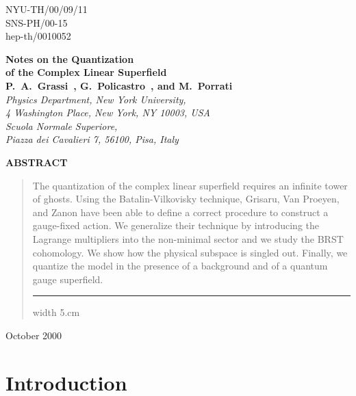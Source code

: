 \documentclass[a4paper,12pt]{article}
\begin{document}
\begin{titlepage}
\begin{flushright}
NYU-TH/00/09/11 \\
SNS-PH/00-15 \\
hep-th/0010052
\end{flushright}
\vfill
\begin{center}
{\LARGE\bf Notes on the Quantization \\ of the Complex Linear
  Superfield}    \\ 
  \large
{\bf  P.~A.~Grassi~\coordHE{}, G.~Policastro~\coordHE{},  and  M.~Porrati~\coordHE{}}\\
\vfill
{\small \it
{}\coordHE{} Physics Department, New York University, \\ 
4 Washington Place, New York,  NY 10003,  USA \\ \vspace{.2cm}
\coordHE{} Scuola Normale Superiore, \\ 
Piazza dei Cavalieri  7, 56100, Pisa, Italy \\}
\end{center}
\vfill

\begin{center}
{\bf ABSTRACT}
\end{center}
\begin{quote}
  The quantization of the complex linear superfield requires an
  infinite tower of ghosts.  Using the Batalin-Vilkovisky technique,
  Grisaru, Van Proeyen, and Zanon have been able to define a correct
  procedure to construct a gauge-fixed action.  We generalize their
  technique by introducing the Lagrange multipliers into the
  non-minimal sector and we study the BRST cohomology.
  We show how the physical subspace is singled out. Finally, we
  quantize the model in the presence of a background and of a quantum
  gauge superfield.  \vfill \hrule width 5.cm 
\end{quote}
\begin{flushleft}
October 2000
\end{flushleft}
\end{titlepage}


\section{Introduction}
\label{introduction}
\end{document}
